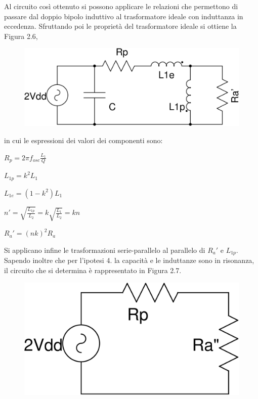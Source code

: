 \documentclass[a4paper, 12pt]{memoir}
\begin{document}
Al circuito così ottenuto si possono applicare le relazioni che permettono di
passare dal doppio bipolo induttivo al trasformatore ideale con induttanza in
eccedenza\cite[pp. 322-323]{GuarnieriET}. Sfruttando poi le proprietà del
trasformatore ideale si ottiene la Figura 2.6,
\begin{figure}[h!]
\includegraphics[height=0.125\textheight]{images/cir_model1.pdf}
\centering
\caption{}
\end{figure}
\noindent in cui le espressioni dei valori dei componenti sono:
\begin{description}
\item $ R_p = 2 \pi f_{osc} \frac{L_1}{Q} $
\item $ L_{1p} = k^2 L_1 $
\item $ L_{1e} = \left( 1 - k^2 \right) L_1 $
\item $ n' = \sqrt{\frac{L_{1p}}{L_2}} = k \sqrt{\frac{L_1}{L_2}} = kn $
\item $ R_a' = {\left( nk \right)}^2 R_a $
\end{description}

Si applicano infine le trasformazioni serie-parallelo\cite[pp. 63-64]{RazaviRF}
al parallelo di  $R_a' $ e $L_{1p}$. Sapendo inoltre che per l'ipotesi 4. 
la capacità e le induttanze sono in risonanza, il circuito che si determina è
rappresentato in Figura 2.7. 
\begin{figure}[h!]
\centering
\includegraphics[height=0.125\textheight]{images/cir_model2.pdf}
\caption{}
\end{figure}
\end{document}
